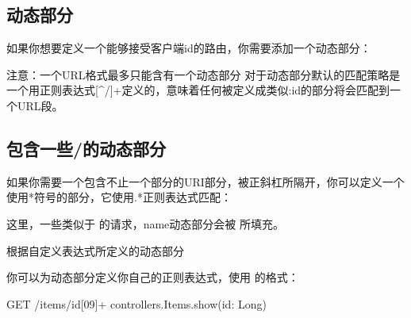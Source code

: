 \documentclass[letterpaper,10pt,english]{sphinxmanual}
\begin{document}
\begin{sphinxVerbatim}[commandchars=\\\{\}]
             
\end{sphinxVerbatim}


\subsection{动态部分}
\label{\detokenize{index:id22}}
如果你想要定义一个能够接受客户端id的路由，你需要添加一个动态部分：

\begin{sphinxVerbatim}[commandchars=\\\{\}]
              
\end{sphinxVerbatim}

注意：一个URL格式最多只能含有一个动态部分
对于动态部分默认的匹配策略是一个用正则表达式{[}\textasciicircum{}/{]}+定义的，意味着任何被定义成类似:id的部分将会匹配到一个URL段。


\subsection{包含一些/的动态部分}
\label{\detokenize{index:id23}}
如果你需要一个包含不止一个部分的URI部分，被正斜杠所隔开，你可以定义一个使用*符号的部分，它使用.*正则表达式匹配：

\begin{sphinxVerbatim}[commandchars=\\\{\}]
             
\end{sphinxVerbatim}

这里，一些类似于  的请求，name动态部分会被  所填充。

根据自定义表达式所定义的动态部分

你可以为动态部分定义你自己的正则表达式，使用  的格式：

\begin{sphinxVerbatim}[commandchars=\\\{\}]
GET   /items/\PYGZdl{}id\PYGZlt{}[0\PYGZhy{}9]+\PYGZgt{}    controllers.Items.show(id: Long)
\end{sphinxVerbatim}
\end{document}

